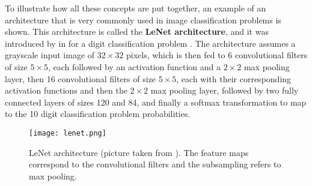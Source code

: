 To illustrate how all these concepts are put together, an example of an architecture that is very commonly used in image classification problems is shown. This architecture is called the \textbf{LeNet architecture}, and it was introduced by \citeauthor{lecun1998gradient} in \citeyear{lecun1998gradient} for a digit classification problem \cite{lecun1998gradient}. The architecture assumes a grayscale input image of $32 \times 32$ pixels, which is then fed to 6 convolutional filters of size $5 \times 5$, each followed by an activation function and a $2 \times 2$ max pooling layer, then 16 convolutional filters of size $5 \times 5$, each with their corresponding activation functions and then the $2 \times 2$ max pooling layer, followed by two fully connected layers of sizes 120 and 84, and finally a softmax transformation to map to the 10 digit classification problem probabilities.

\begin{figure}[H]
    \centering
    \texttt{[image: lenet.png]}
    \caption{LeNet architecture (picture taken from \cite{lecun1998gradient}). The feature maps correspond to the convolutional filters and the subsampling refers to max pooling.}
    \label{fig:lenet_architecture}
\end{figure}
